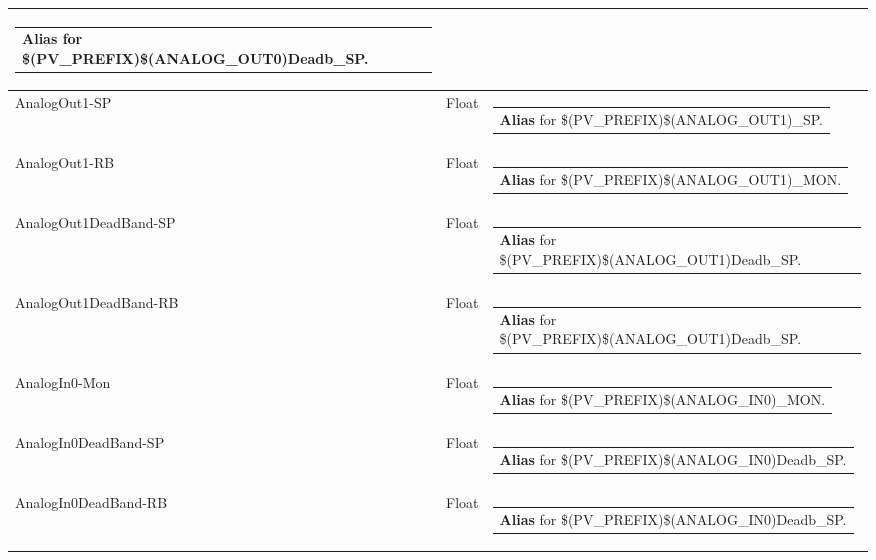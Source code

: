 \documentclass[openany]{article}
\begin{document}
\begin{longtable}{| m{4.5cm} m{2.5cm}  m{8.5cm} |}
\begin{tabular}{@{}m{6cm}@{}}
                \textbf{\color{blue} Alias} for \$(PV\_PREFIX)\$(ANALOG\_OUT0)Deadb\_SP.
            \end{tabular} \hypertarget{pv:analog-out-1}{}\\ \hline
        AnalogOut1-SP & Float & \begin{tabular}{@{}m{6cm}@{}}
                \textbf{\color{blue} Alias} for \$(PV\_PREFIX)\$(ANALOG\_OUT1)\_SP.
            \end{tabular} \hypertarget{}{}\\ \hline
        AnalogOut1-RB & Float & \begin{tabular}{@{}m{6cm}@{}}
                \textbf{\color{blue} Alias} for \$(PV\_PREFIX)\$(ANALOG\_OUT1)\_MON.
            \end{tabular} \hypertarget{pv:analog-out-1-dead-band}{}\\ \hline
        AnalogOut1DeadBand-SP & Float & \begin{tabular}{@{}m{6cm}@{}}
                \textbf{\color{blue} Alias} for \$(PV\_PREFIX)\$(ANALOG\_OUT1)Deadb\_SP.
            \end{tabular} \hypertarget{}{}\\ \hline
        AnalogOut1DeadBand-RB & Float & \begin{tabular}{@{}m{6cm}@{}}
                \textbf{\color{blue} Alias} for \$(PV\_PREFIX)\$(ANALOG\_OUT1)Deadb\_SP.
            \end{tabular} \hypertarget{pv:analog-in-0-mon}{}\\ \hline
        AnalogIn0-Mon & Float & \begin{tabular}{@{}m{6cm}@{}}
                \textbf{\color{blue} Alias} for \$(PV\_PREFIX)\$(ANALOG\_IN0)\_MON.
            \end{tabular} \hypertarget{pv:analog-in-0-dead-band}{}\\ \hline
        AnalogIn0DeadBand-SP & Float & \begin{tabular}{@{}m{6cm}@{}}
                \textbf{\color{blue} Alias} for \$(PV\_PREFIX)\$(ANALOG\_IN0)Deadb\_SP.
            \end{tabular} \hypertarget{}{}\\ \hline
        AnalogIn0DeadBand-RB & Float & \begin{tabular}{@{}m{6cm}@{}}
                \textbf{\color{blue} Alias} for \$(PV\_PREFIX)\$(ANALOG\_IN0)Deadb\_SP.

\end{tabular}
\end{longtable}
\end{document}

